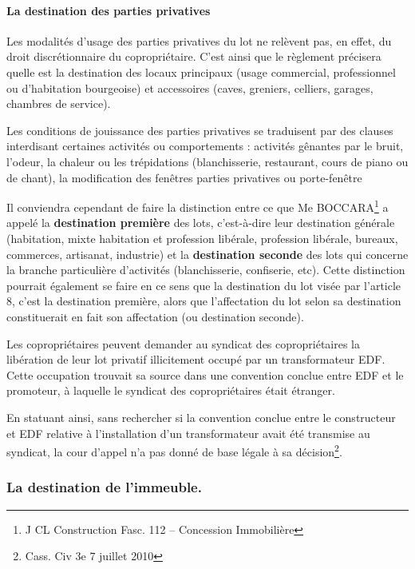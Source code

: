 			\paragraph{La destination des parties privatives}
				
				Les modalités d’usage des parties privatives du lot ne relèvent pas, en effet, du droit discrétionnaire du copropriétaire. C'est ainsi que le règlement précisera quelle est la destination des locaux principaux (usage commercial, professionnel ou d'habitation bourgeoise) et accessoires (caves, greniers, celliers, garages, chambres de service).
				
				Les conditions de jouissance des parties privatives se traduisent par des clauses interdisant certaines activités ou comportements : activités gênantes par le bruit, l'odeur, la chaleur ou les trépidations (blanchisserie, restaurant, cours de piano ou de chant), la modification des fenêtres parties privatives ou porte-fenêtre \etc
				
				Il conviendra cependant de faire la distinction entre ce que Me BOCCARA\footnote{J CL Construction Fasc. 112 – Concession Immobilière } a appelé la \textbf{destination première} des lots, c'est-à-dire leur destination générale (habitation, mixte habitation et profession libérale, profession libérale, bureaux, commerces, artisanat, industrie) et la \textbf{destination seconde} des lots qui concerne la branche particulière d’activités (blanchisserie, confiserie, etc). Cette distinction pourrait également se faire en ce sens que la destination du lot visée par l’article 8, c’est la destination première, alors que l’affectation du lot selon sa destination constituerait en fait son affectation (ou destination seconde).
				
				Les copropriétaires peuvent demander au syndicat des copropriétaires la libération de leur lot privatif illicitement occupé par un transformateur EDF. Cette occupation trouvait sa source dans une convention conclue entre EDF et le promoteur, à laquelle le syndicat des copropriétaires était étranger.
				
				En statuant ainsi, sans rechercher si la convention conclue entre le constructeur et EDF relative à l'installation d'un transformateur avait été transmise au syndicat, la cour d'appel n'a pas donné de base légale à sa décision\footnote{Cass. Civ 3e 7 juillet 2010}.
		
		\subsubsection{La destination de l'immeuble.}
		
